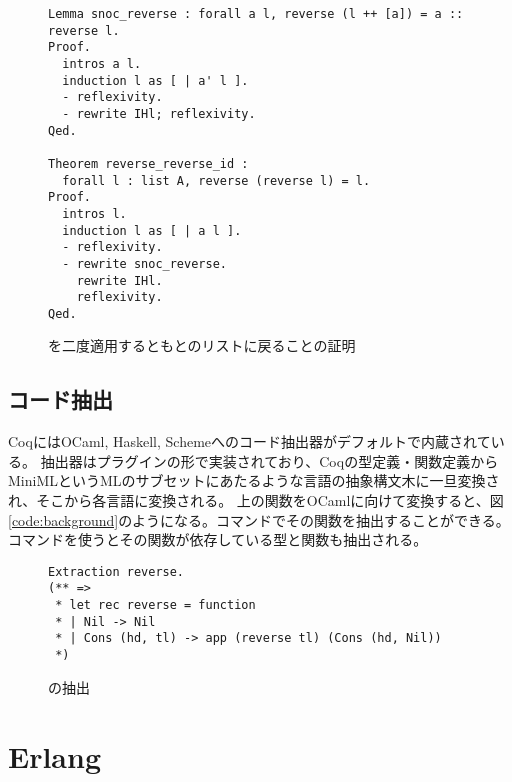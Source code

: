 \begin{figure}
\begin{lstlisting}
Lemma snoc_reverse : forall a l, reverse (l ++ [a]) = a :: reverse l.
Proof.
  intros a l.
  induction l as [ | a' l ].
  - reflexivity.
  - rewrite IHl; reflexivity.
Qed.

Theorem reverse_reverse_id :
  forall l : list A, reverse (reverse l) = l.
Proof.
  intros l.
  induction l as [ | a l ].
  - reflexivity.
  - rewrite snoc_reverse.
    rewrite IHl.
    reflexivity.
Qed.
\end{lstlisting}
\label{code:background:reverse-reverse}
\caption{を二度適用するともとのリストに戻ることの証明}
\end{figure}


\subsection{コード抽出}

CoqにはOCaml, Haskell, Schemeへのコード抽出器がデフォルトで内蔵されている。
抽出器はプラグインの形で実装されており、Coqの型定義・関数定義からMiniMLというMLのサブセットにあたるような言語の抽象構文木に一旦変換され、そこから各言語に変換される。
上の関数をOCamlに向けて変換すると、図\ref{code:background}のようになる。コマンドでその関数を抽出することができる。
コマンドを使うとその関数が依存している型と関数も抽出される。

\begin{figure}
\begin{lstlisting}
Extraction reverse.
(** =>
 * let rec reverse = function
 * | Nil -> Nil
 * | Cons (hd, tl) -> app (reverse tl) (Cons (hd, Nil))
 *)
\end{lstlisting}
\label{code:background:reverse-reverse}
\caption{の抽出}
\end{figure}



\section{Erlang}

